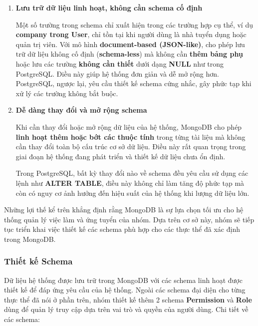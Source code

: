 \begin{enumerate}
    \item \textbf{Lưu trữ dữ liệu linh hoạt, không cần schema cố định}

    Một số trường trong schema chỉ xuất hiện trong các trường hợp cụ thể, ví dụ \textbf{company trong User}, chỉ tồn tại khi người dùng là nhà tuyển dụng hoặc quản trị viên. Với mô hình \textbf{document-based (JSON-like)}, cho phép lưu trữ dữ liệu không cố định (\textbf{schema-less}) mà không cần \textbf{thêm bảng phụ} hoặc lưu các trường \textbf{không cần thiết} dưới dạng \textbf{NULL} như trong PostgreSQL. Điều này giúp hệ thống đơn giản và dễ mở rộng hơn. PostgreSQL, ngược lại, yêu cầu thiết kế schema cứng nhắc, gây phức tạp khi xử lý các trường không bắt buộc.

    \item \textbf{Dễ dàng thay đổi và mở rộng schema}

    Khi cần thay đổi hoặc mở rộng dữ liệu của hệ thống, MongoDB cho phép \textbf{linh hoạt thêm hoặc bớt các thuộc tính} trong từng tài liệu mà không cần thay đổi toàn bộ cấu trúc cơ sở dữ liệu. Điều này rất quan trọng trong giai đoạn hệ thống đang phát triển và thiết kế dữ liệu chưa ổn định.

    Trong PostgreSQL, bất kỳ thay đổi nào về schema đều yêu cầu sử dụng các lệnh như \textbf{ALTER TABLE}, điều này không chỉ làm tăng độ phức tạp mà còn có nguy cơ ảnh hưởng đến hiệu suất của hệ thống khi lượng dữ liệu lớn.
\end{enumerate}

Những lợi thế kể trên khẳng định rằng MongoDB là sự lựa chọn tối ưu cho hệ thống quản lý việc làm và ứng tuyển của nhóm. Dựa trên cơ sở này, nhóm sẽ tiếp tục triển khai việc thiết kế các schema phù hợp cho các thực thể đã xác định trong MongoDB.

\subsubsection{Thiết kế Schema}

Dữ liệu hệ thống được lưu trữ trong MongoDB với các schema linh hoạt được thiết kế để đáp ứng yêu cầu của hệ thống. Ngoài các schema đại diện cho từng thực thể đã nói ở phần trên, nhóm thiết kế thêm 2 schema \textbf{Permission} và \textbf{Role} dùng để quản lý truy cập dựa trên vai trò và quyền của người dùng. Chi tiết về các schema:

